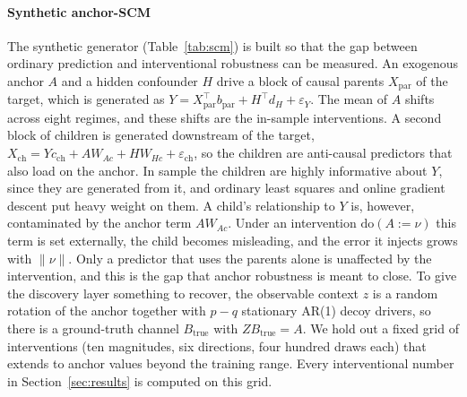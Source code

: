 \documentclass[authoryear,preprint,12pt]{elsarticle}
\theoremstyle{plain}
\theoremstyle{remark}
\newcommand{\doop}{\mathrm{do}}
\begin{document}
\paragraph{Synthetic anchor-SCM}
The synthetic generator (Table~\ref{tab:scm}) is built so that the gap between
ordinary prediction and interventional robustness can be measured. An exogenous anchor
$A$ and a hidden confounder $H$ drive a block of causal parents $X_{\mathrm{par}}$ of
the target, which is generated as $Y=X_{\mathrm{par}}^\top b_{\mathrm{par}}+H^\top d_H+
\varepsilon_Y$. The mean of $A$ shifts across eight regimes, and these shifts are the
in-sample interventions. A second block of children is generated downstream of the
target, $X_{\mathrm{ch}}=Yc_{\mathrm{ch}}+AW_{Ac}+HW_{Hc}+\varepsilon_{\mathrm{ch}}$,
so the children are anti-causal predictors that also load on the anchor. In sample the
children are highly informative about $Y$, since they are generated from it, and
ordinary least squares and online gradient descent put heavy weight on them. A child's
relationship to $Y$ is, however, contaminated by the anchor term $AW_{Ac}$. Under an
intervention $\doop(A:=\nu)$ this term is set externally, the child becomes misleading,
and the error it injects grows with $\|\nu\|$. Only a predictor that uses the parents
alone is unaffected by the intervention, and this is the gap that anchor robustness is
meant to close. To give the discovery layer something to recover, the observable
context $z$ is a random rotation of the anchor together with $p-q$ stationary AR(1)
decoy drivers, so there is a ground-truth channel $B_{\text{true}}$ with
$ZB_{\text{true}}=A$. We hold out a fixed grid of interventions (ten magnitudes, six
directions, four hundred draws each) that extends to anchor values beyond the training
range. Every interventional number in Section~\ref{sec:results} is computed on this
grid.
\end{document}

